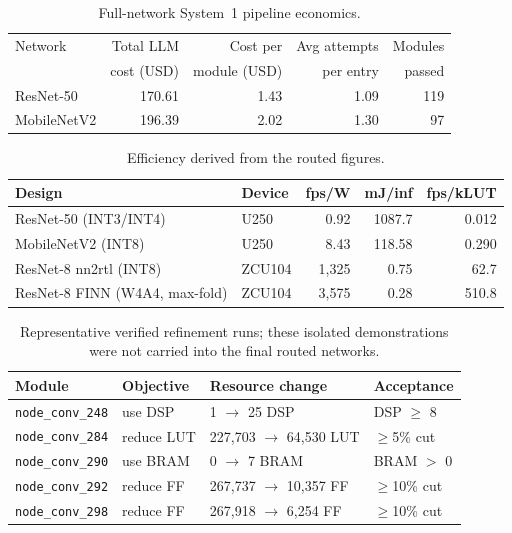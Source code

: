 \documentclass[acmtog,authorversion]{acmart}
\begin{document}
\begin{table}[!htbp]
\centering
\caption{Full-network System~1 pipeline economics.}
\label{tab:rq1cost}
\setlength{\tabcolsep}{2pt}
\begin{tabular}{@{}lrrrr@{}}
\toprule
Network & Total LLM & Cost per & Avg attempts & Modules \\
        & cost (USD) & module (USD) & per entry & passed \\
\midrule
ResNet-50    & 170.61 & 1.43 & 1.09 & 119 \\
MobileNetV2  & 196.39 & 2.02 & 1.30 & 97 \\
\bottomrule
\end{tabular}
\end{table}

\begin{table}[!htbp]
\centering
\caption{Efficiency derived from the routed figures.}
\label{tab:efficiency}
\setlength{\tabcolsep}{1pt}
\begin{tabular}{@{}llrrr@{}}
\toprule
Design & Device & fps/W & mJ/inf & fps/kLUT \\
\midrule
ResNet-50 (INT3/INT4) & U250 & 0.92 & 1087.7 & 0.012 \\
MobileNetV2 (INT8) & U250 & 8.43 & 118.58 & 0.290 \\
ResNet-8 nn2rtl (INT8) & ZCU104 & 1,325 & 0.75 & 62.7 \\
ResNet-8 FINN (W4A4, max-fold) & ZCU104 & 3,575 & 0.28 & 510.8 \\
\bottomrule
\end{tabular}
\end{table}

\FloatBarrier
\onecolumn

\begin{table}[!htbp]
\centering
\caption{Representative verified refinement runs; these isolated demonstrations were not carried into the final routed networks.}
\label{tab:improve}
\setlength{\tabcolsep}{2pt}
\begin{tabular}{@{}p{}p{}p{}p{}@{}}
\toprule
Module & Objective & Resource change & Acceptance \\
\midrule
\texttt{node\_conv\_248} & use DSP & 1 $\rightarrow$ 25 DSP & DSP $\geq$ 8 \\
\texttt{node\_conv\_284} & reduce LUT & 227,703 $\rightarrow$ 64,530 LUT & $\geq$5\% cut \\
\texttt{node\_conv\_290} & use BRAM & 0 $\rightarrow$ 7 BRAM & BRAM $>$ 0 \\
\texttt{node\_conv\_292} & reduce FF & 267,737 $\rightarrow$ 10,357 FF & $\geq$10\% cut \\
\texttt{node\_conv\_298} & reduce FF & 267,918 $\rightarrow$ 6,254 FF & $\geq$10\% cut \\
\bottomrule
\end{tabular}
\end{table}
\FloatBarrier
\end{document}
